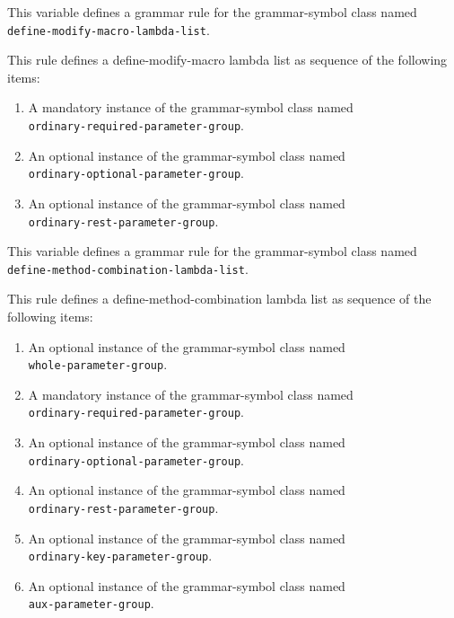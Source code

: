 
This variable defines a grammar rule for the grammar-symbol class
named \texttt{define-modify-macro-lambda-list}.

This rule defines a define-modify-macro lambda list as sequence of the
following items:

\begin{enumerate}
\item A mandatory instance of the grammar-symbol class named\\
  \texttt{ordinary-required-parameter-group}.
\item An optional instance of the grammar-symbol class named\\
  \texttt{ordinary-optional-parameter-group}.
\item An optional instance of the grammar-symbol class named\\
\texttt{ordinary-rest-parameter-group}.
\end{enumerate}


This variable defines a grammar rule for the grammar-symbol class
named \texttt{define-method-combination-lambda-list}.

This rule defines a define-method-combination lambda list as sequence
of the following items:

\begin{enumerate}
\item An optional instance of the grammar-symbol class named\\
  \texttt{whole-parameter-group}.
\item A mandatory instance of the grammar-symbol class named\\
  \texttt{ordinary-required-parameter-group}.
\item An optional instance of the grammar-symbol class named\\
  \texttt{ordinary-optional-parameter-group}.
\item An optional instance of the grammar-symbol class named\\
\texttt{ordinary-rest-parameter-group}.
\item An optional instance of the grammar-symbol class named\\
\texttt{ordinary-key-parameter-group}.
\item An optional instance of the grammar-symbol class named\\
\texttt{aux-parameter-group}.
\end{enumerate}

